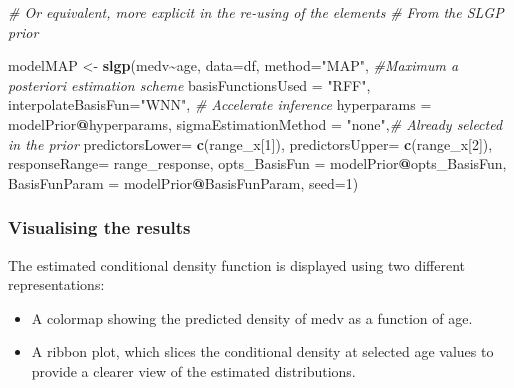\documentclass[
]{article}
\newenvironment{Shaded}{\begin{snugshade}}{\end{snugshade}}
\newcommand{\AttributeTok}[1]{\textcolor[rgb]{0.13,0.29,0.53}{#1}}
\newcommand{\CommentTok}[1]{\textcolor[rgb]{0.56,0.35,0.01}{\textit{#1}}}
\newcommand{\DecValTok}[1]{\textcolor[rgb]{0.00,0.00,0.81}{#1}}
\newcommand{\FunctionTok}[1]{\textcolor[rgb]{0.13,0.29,0.53}{\textbf{#1}}}
\newcommand{\NormalTok}[1]{#1}
\newcommand{\OtherTok}[1]{\textcolor[rgb]{0.56,0.35,0.01}{#1}}
\newcommand{\SpecialCharTok}[1]{\textcolor[rgb]{0.81,0.36,0.00}{\textbf{#1}}}
\newcommand{\StringTok}[1]{\textcolor[rgb]{0.31,0.60,0.02}{#1}}
\begin{document}
\begin{Shaded}
\begin{Highlighting}[]
\CommentTok{\# Or equivalent, more explicit in the re{-}using of the elements}
\CommentTok{\# From the SLGP prior}

\NormalTok{modelMAP }\OtherTok{\textless{}{-}} \FunctionTok{slgp}\NormalTok{(medv}\SpecialCharTok{\textasciitilde{}}\NormalTok{age, }
                 \AttributeTok{data=}\NormalTok{df,}
                 \AttributeTok{method=}\StringTok{"MAP"}\NormalTok{, }\CommentTok{\#Maximum a posteriori estimation scheme}
                 \AttributeTok{basisFunctionsUsed =} \StringTok{"RFF"}\NormalTok{,}
                 \AttributeTok{interpolateBasisFun=}\StringTok{"WNN"}\NormalTok{, }\CommentTok{\# Accelerate inference}
                 \AttributeTok{hyperparams =}\NormalTok{ modelPrior}\SpecialCharTok{@}\NormalTok{hyperparams, }
                 \AttributeTok{sigmaEstimationMethod =} \StringTok{"none"}\NormalTok{,}\CommentTok{\# Already selected in the prior}
                 \AttributeTok{predictorsLower=} \FunctionTok{c}\NormalTok{(range\_x[}\DecValTok{1}\NormalTok{]),}
                 \AttributeTok{predictorsUpper=} \FunctionTok{c}\NormalTok{(range\_x[}\DecValTok{2}\NormalTok{]),}
                 \AttributeTok{responseRange=}\NormalTok{ range\_response,}
                 \AttributeTok{opts\_BasisFun =}\NormalTok{ modelPrior}\SpecialCharTok{@}\NormalTok{opts\_BasisFun,}
                 \AttributeTok{BasisFunParam =}\NormalTok{ modelPrior}\SpecialCharTok{@}\NormalTok{BasisFunParam,}
                 \AttributeTok{seed=}\DecValTok{1}\NormalTok{)}
\end{Highlighting}
\end{Shaded}

\subsubsection{Visualising the results}\label{visualising-the-results}

The estimated conditional density function is displayed using two different representations:

\begin{itemize}
\item
  A colormap showing the predicted density of medv as a function of age.
\item
  A ribbon plot, which slices the conditional density at selected age values to provide a clearer view of the estimated distributions.
\end{itemize}
\end{document}
